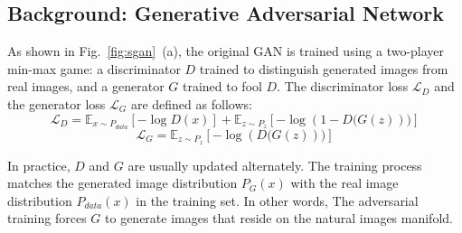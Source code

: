 \documentclass[10pt,twocolumn,letterpaper]{article}
\begin{document}
\subsection{Background: Generative Adversarial Network}
\label{GAN}
As shown in Fig.~\ref{fig:sgan}~(a), the original GAN \cite{goodfellow2014generative} is trained using a two-player min-max game: a discriminator $D$ trained to distinguish generated images from real images, and a generator $G$ trained to fool $D$. The discriminator loss $\mathcal{L}_{D}$ and the generator loss $\mathcal{L}_{G}$ are defined as follows: 
\begin{equation}
\mathcal{L}_{D} =  \mathbb{E}_{x\sim P_{data}}[-\log D(x)] +\mathbb{E}_{z\sim P_{z}}[-\log (1-D\big(G(z))\big)] 
\end{equation} 
\begin{equation}
\mathcal{L}_{G} = \mathbb{E}_{z\sim P_{z}}[ -\log (D\big(G(z))\big)] 
\end{equation}

In practice, $D$ and $G$ are usually updated alternately. The training process matches the generated image distribution $P_{G}(x)$ with the real image distribution $P_{data}(x)$ in the training set. In other words, The adversarial training forces $G$ to generate images that reside on the natural images manifold. 

\end{document}
